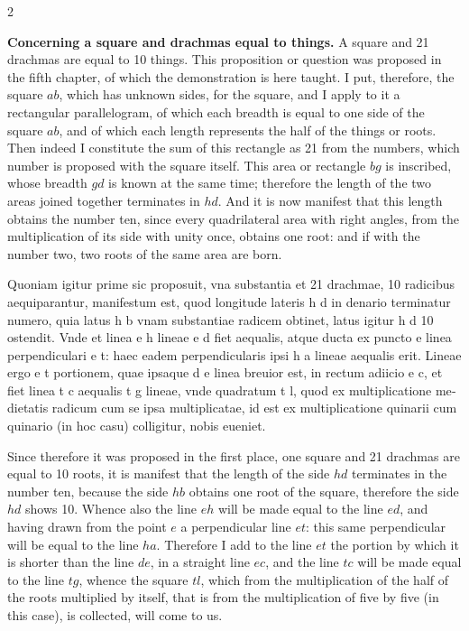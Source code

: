 \documentclass[11pt,a4paper,twoside]{book}
\newcommand{\latincolumn}[1]{\textlatin{\small #1}}
\begin{document}
\begin{paracol}{2}
\switchcolumn

\textbf{Concerning a square and drachmas equal to things.} A square and 21 drachmas are equal to 10 things. This proposition or question was proposed in the fifth chapter, of which the demonstration is here taught. I put, therefore, the square $ab$, which has unknown sides, for the square, and I apply to it a rectangular parallelogram, of which each breadth is equal to one side of the square $ab$, and of which each length represents the half of the things or roots. Then indeed I constitute the sum of this rectangle as 21 from the numbers, which number is proposed with the square itself. This area or rectangle $bg$ is inscribed, whose breadth $gd$ is known at the same time; therefore the length of the two areas joined together terminates in $hd$. And it is now manifest that this length obtains the number ten, since every quadrilateral area with right angles, from the multiplication of its side with unity once, obtains one root: and if with the number two, two roots of the same area are born.

\switchcolumn*

\latincolumn{Quoniam igitur prime sic proposuit, vna substantia et 21 drachmae, 10 radicibus aequiparantur, manifestum est, quod longitude lateris h d in denario terminatur numero, quia latus h b vnam substantiae radicem obtinet, latus igitur h d 10 ostendit. Vnde et linea e h lineae e d fiet aequalis, atque ducta ex puncto e linea perpendiculari e t: haec eadem perpendicularis ipsi h a lineae aequalis erit. Lineae ergo e t portionem, quae ipsaque d e linea breuior est, in rectum adiicio e c, et fiet linea t c aequalis t g lineae, vnde quadratum t l, quod ex multiplicatione medietatis radicum cum se ipsa multiplicatae, id est ex multiplicatione quinarii cum quinario (in hoc casu) colligitur, nobis eueniet.}

\switchcolumn

Since therefore it was proposed in the first place, one square and 21 drachmas are equal to 10 roots, it is manifest that the length of the side $hd$ terminates in the number ten, because the side $hb$ obtains one root of the square, therefore the side $hd$ shows 10. Whence also the line $eh$ will be made equal to the line $ed$, and having drawn from the point $e$ a perpendicular line $et$: this same perpendicular will be equal to the line $ha$. Therefore I add to the line $et$ the portion by which it is shorter than the line $de$, in a straight line $ec$, and the line $tc$ will be made equal to the line $tg$, whence the square $tl$, which from the multiplication of the half of the roots multiplied by itself, that is from the multiplication of five by five (in this case), is collected, will come to us.


\end{paracol}
\end{document}
